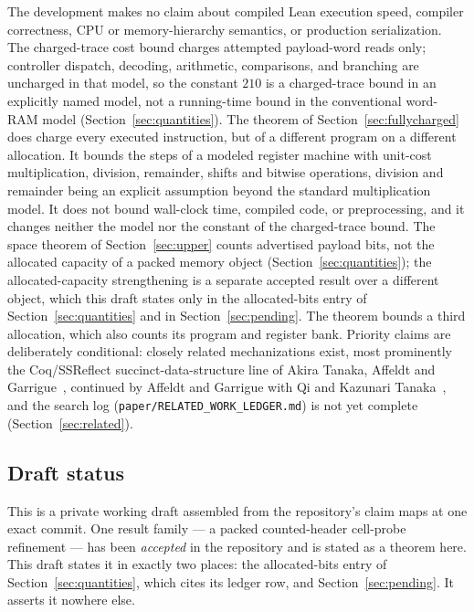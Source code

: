 \documentclass[11pt]{article}
\newcommand{\ledger}[1]{}
\theoremstyle{definition}
\theoremstyle{remark}
\begin{document}
The development makes no claim about compiled Lean execution speed, compiler
correctness, CPU or memory-hierarchy semantics, or production serialization.
The charged-trace cost bound charges attempted payload-word reads only;
controller dispatch, decoding, arithmetic, comparisons, and branching are
uncharged in that model, so the constant $210$ is a charged-trace bound in an
explicitly named model, not a running-time bound in the conventional
word-RAM model (Section~\ref{sec:quantities}). The theorem of
Section~\ref{sec:fullycharged} does charge every executed instruction, but of
a different program on a different allocation. It bounds the steps of a
modeled register machine with unit-cost multiplication, division, remainder,
shifts and bitwise operations, division and remainder being an explicit
assumption beyond the standard multiplication model. It does not bound
wall-clock time, compiled code, or preprocessing, and it changes neither the
model nor the constant of the charged-trace bound.\ledger{L-PQ-01} The space
theorem of Section~\ref{sec:upper} counts advertised payload bits, not the allocated
capacity of a packed memory object (Section~\ref{sec:quantities}); the
allocated-capacity strengthening is a separate accepted result over a
different object, which this draft states only in the allocated-bits entry of
Section~\ref{sec:quantities} and in Section~\ref{sec:pending}. The theorem bounds a third allocation, which also counts its program and
register bank. Priority claims are deliberately conditional:
closely related mechanizations exist, most prominently the
Coq/SSReflect succinct-data-structure line of Akira Tanaka, Affeldt and
Garrigue~\cite{TAG16}, continued by Affeldt and Garrigue with Qi and
Kazunari Tanaka~\cite{AGQT19}, and the search log
(\texttt{paper/RELATED\_WORK\_LEDGER.md}) is not yet complete
(Section~\ref{sec:related}).

\subsection{Draft status}\label{sec:status}

This is a private working draft assembled from the repository's claim maps
at one exact commit. One result family --- a packed
counted-header cell-probe refinement --- has been \emph{accepted} in the
repository and is stated as a theorem here. This draft states it in
exactly two places: the
allocated-bits entry of Section~\ref{sec:quantities}, which cites its ledger
row, and Section~\ref{sec:pending}. It asserts it nowhere else.
\end{document}
